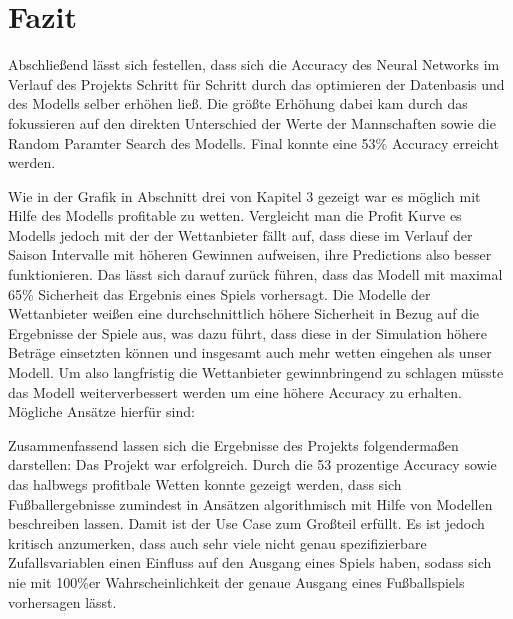 \chapter{Fazit}

Abschließend lässt sich festellen, dass sich die Accuracy des Neural Networks
im Verlauf des Projekts Schritt für Schritt durch das optimieren der Datenbasis
und des Modells selber erhöhen ließ. Die größte Erhöhung dabei kam durch das fokussieren
auf den direkten Unterschied der Werte der Mannschaften sowie die Random Paramter Search
des Modells. Final konnte eine 53\% Accuracy erreicht werden.

Wie in der Grafik in Abschnitt drei von Kapitel 3 gezeigt war es möglich mit Hilfe
des Modells profitable zu wetten. Vergleicht man die Profit Kurve es Modells jedoch
mit der der Wettanbieter fällt auf, dass diese im Verlauf der Saison Intervalle mit
höheren Gewinnen aufweisen, ihre Predictions also besser funktionieren. Das lässt sich
darauf zurück führen, dass das Modell mit maximal 65\% Sicherheit das Ergebnis eines Spiels
vorhersagt. Die Modelle der Wettanbieter weißen eine durchschnittlich höhere Sicherheit in Bezug auf die
Ergebnisse der Spiele aus, was dazu führt, dass diese in der Simulation höhere Beträge
einsetzten können und insgesamt auch mehr wetten eingehen als unser Modell.
Um also langfristig die Wettanbieter gewinnbringend zu schlagen müsste das Modell
weiterverbessert werden um eine höhere Accuracy zu erhalten. Mögliche Ansätze hierfür
sind:

Zusammenfassend lassen sich die Ergebnisse des Projekts folgendermaßen darstellen:
Das Projekt war erfolgreich. Durch die 53 prozentige Accuracy sowie das halbwegs
profitbale Wetten konnte gezeigt werden, dass sich Fußballergebnisse zumindest in
Ansätzen algorithmisch mit Hilfe von Modellen beschreiben lassen. Damit ist der Use
Case zum Großteil erfüllt. Es ist jedoch kritisch anzumerken, dass auch sehr viele
nicht genau spezifizierbare Zufallsvariablen einen Einfluss auf den Ausgang
eines Spiels haben, sodass sich nie mit 100\%er Wahrscheinlichkeit der genaue Ausgang
eines Fußballspiels vorhersagen lässt.